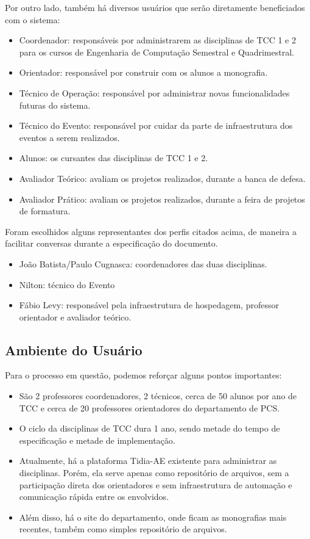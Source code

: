 Por outro lado, também há diversos usuários que serão diretamente beneficiados com o sistema:

\begin{itemize}
    \item Coordenador: responsáveis por administrarem as disciplinas de TCC 1 e 2 para os cursos de Engenharia de Computação Semestral e Quadrimestral.
    \item Orientador: responsável por construir com os alunos a monografia.
    \item Técnico de Operação: responsável por administrar novas funcionalidades futuras do sistema.
    \item Técnico do Evento: responsável por cuidar da parte de infraestrutura dos eventos a serem realizados.
    \item Alunos: os cursantes das disciplinas de TCC 1 e 2.
    \item Avaliador Teórico: avaliam os projetos realizados, durante a banca de defesa.
    \item Avaliador Prático: avaliam os projetos realizados, durante a feira de projetos de formatura.
\end{itemize}

Foram escolhidos alguns representantes dos perfis citados acima, de maneira a facilitar conversas durante a especificação do documento.

\begin{itemize}
    \item João Batista/Paulo Cugnasca: coordenadores das duas disciplinas.
    \item Nilton: técnico do Evento
    \item Fábio Levy: responsável pela infraestrutura de hospedagem, professor orientador e avaliador teórico.
\end{itemize}

\subsection{Ambiente do Usuário}
Para o processo em questão, podemos reforçar alguns pontos importantes:

\begin{itemize}
    \item São 2 professores coordenadores, 2 técnicos, cerca de 50 alunos por ano de TCC e cerca de 20 professores orientadores do departamento de PCS.
    \item O ciclo da disciplinas de TCC dura 1 ano, sendo metade do tempo de especificação e metade de implementação.
    \item Atualmente, há a plataforma Tidia-AE existente para administrar as disciplinas. Porém, ela serve apenas como repositório de arquivos, sem a participação direta dos orientadores e sem infraestrutura de automação e comunicação rápida entre os envolvidos.
    \item Além disso, há o site do departamento, onde ficam as monografias mais recentes, também como simples repositório de arquivos.
\end{itemize}

